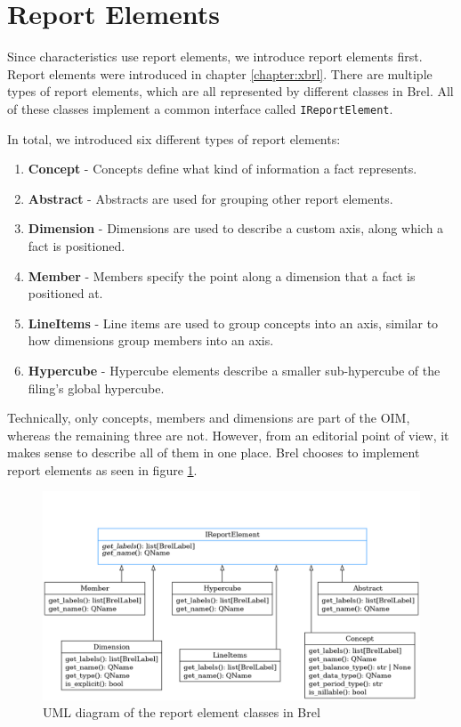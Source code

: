 \section{Report Elements}
\label{sec:api_report_elements}

Since characteristics use report elements, we introduce report elements first.
Report elements were introduced in chapter \ref{chapter:xbrl}.
There are multiple types of report elements, which are all represented by different classes in Brel.
All of these classes implement a common interface called \texttt{IReportElement}.

In total, we introduced six different types of report elements:

\begin{enumerate}
    \item \textbf{Concept} - Concepts define what kind of information a fact represents.
    \item \textbf{Abstract} - Abstracts are used for grouping other report elements.
    \item \textbf{Dimension} - Dimensions are used to describe a custom axis, along which a fact is positioned. 
    \item \textbf{Member} - Members specify the point along a dimension that a fact is positioned at.
    \item \textbf{LineItems} - Line items are used to group concepts into an axis, 
    similar to how dimensions group members into an axis.
    \item \textbf{Hypercube} - Hypercube elements describe a smaller sub-hypercube of the filing's global hypercube.
\end{enumerate}

Technically, only concepts, members and dimensions are part of the OIM, whereas the remaining three are not.
However, from an editorial point of view, it makes sense to describe all of them in one place.
Brel chooses to implement report elements as seen in figure \ref{fig:brel_report_element_classes}.

\begin{figure}[H]
    \centering
    \includegraphics[width=\textwidth]{images/brel_report_elements_classes.png}
    \caption{UML diagram of the report element classes in Brel}
    \label{fig:brel_report_element_classes}
\end{figure}

